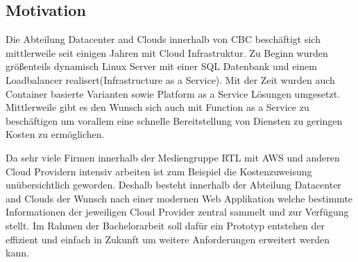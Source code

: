 \subsection{Motivation}

Die Abteilung Datacenter and Clouds innerhalb von CBC beschäftigt sich mittlerweile seit einigen Jahren mit Cloud Infrastruktur.
Zu Beginn wurden größenteils dynamisch Linux Server mit einer SQL Datenbank und einem Loadbalancer realisert(Infrastructure as a Service).
Mit der Zeit wurden auch Container basierte Varianten sowie Platform as a Service Lösungen umgesetzt. Mittlerweile gibt es den Wunsch sich auch
mit Function as a Service zu beschäftigen um vorallem eine schnelle Bereitstellung von Diensten zu geringen Kosten zu ermöglichen.

Da sehr viele Firmen innerhalb der Mediengruppe RTL mit AWS und anderen Cloud Providern intensiv arbeiten ist zum Beispiel die Kostenzuweisung unübersichtlich geworden.
Deshalb besteht innerhalb der Abteilung Datacenter and Clouds der Wunsch nach einer modernen Web Applikation welche bestimmte Informationen der jeweiligen Cloud Provider
zentral sammelt und zur Verfügung stellt. Im Rahmen der Bachelorarbeit soll dafür ein Prototyp entstehen der effizient und einfach in Zukunft um weitere Anforderungen erweitert
werden kann.

